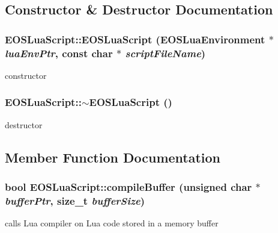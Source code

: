 \subsection{Constructor \& Destructor Documentation}
\hypertarget{classEOSLuaScript_4983ae13c09b63b607885c0770655362}{
\subsubsection[{EOSLuaScript}]{\setlength{\rightskip}{0pt plus 5cm}EOSLuaScript::EOSLuaScript ({\bf EOSLuaEnvironment} $\ast$ {\em luaEnvPtr}, \/  const char $\ast$ {\em scriptFileName})}}
\label{classEOSLuaScript_4983ae13c09b63b607885c0770655362}


constructor 

\hypertarget{classEOSLuaScript_0967a55fb7371b9e5808822ba184996b}{
\subsubsection[{$\sim$EOSLuaScript}]{\setlength{\rightskip}{0pt plus 5cm}EOSLuaScript::$\sim$EOSLuaScript ()}}
\label{classEOSLuaScript_0967a55fb7371b9e5808822ba184996b}


destructor 



\subsection{Member Function Documentation}
\hypertarget{classEOSLuaScript_c1d576d2d3ffa64a9437a062f325a813}{
\subsubsection[{compileBuffer}]{\setlength{\rightskip}{0pt plus 5cm}bool EOSLuaScript::compileBuffer (unsigned char $\ast$ {\em bufferPtr}, \/  size\_\-t {\em bufferSize})}}
\label{classEOSLuaScript_c1d576d2d3ffa64a9437a062f325a813}


calls Lua compiler on Lua code stored in a memory buffer 


